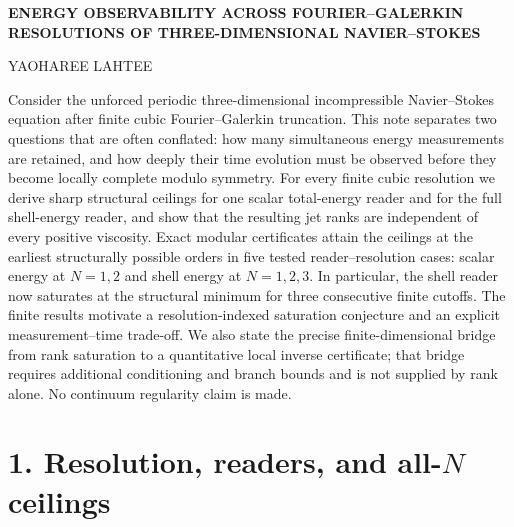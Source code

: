 \documentclass[10pt,leqno,twoside]{article}
\theoremstyle{plain}
\theoremstyle{remark}
\begin{document}
\thispagestyle{plain}

\vspace*{-0.18in}
\begin{center}
{\bfseries\large ENERGY OBSERVABILITY ACROSS FOURIER--GALERKIN\\[2pt]
RESOLUTIONS OF THREE-DIMENSIONAL NAVIER--STOKES}

\vspace{0.27in}
{\small YAOHAREE LAHTEE}
\end{center}

\vspace{0.18in}

Consider the unforced periodic three-dimensional incompressible Navier--Stokes equation after
finite cubic Fourier--Galerkin truncation.  This note separates two questions that are often
conflated: how many simultaneous energy measurements are retained, and how deeply their time
evolution must be observed before they become locally complete modulo symmetry.  For every
finite cubic resolution we derive sharp structural ceilings for one scalar total-energy reader
and for the full shell-energy reader, and show that the resulting jet ranks are independent of
every positive viscosity.  Exact modular certificates attain the ceilings at the earliest
structurally possible orders in five tested reader--resolution cases: scalar energy at $N=1,2$
and shell energy at $N=1,2,3$.  In particular, the shell reader now saturates at the structural
minimum for three consecutive finite cutoffs.  The finite results motivate a resolution-indexed
saturation conjecture and an explicit measurement--time trade-off.  We also state the precise
finite-dimensional bridge from rank saturation to a quantitative local inverse certificate;
that bridge requires additional conditioning and branch bounds and is not supplied by rank alone.
No continuum regularity claim is made.

\section*{1. Resolution, readers, and all-$N$ ceilings}
\end{document}
